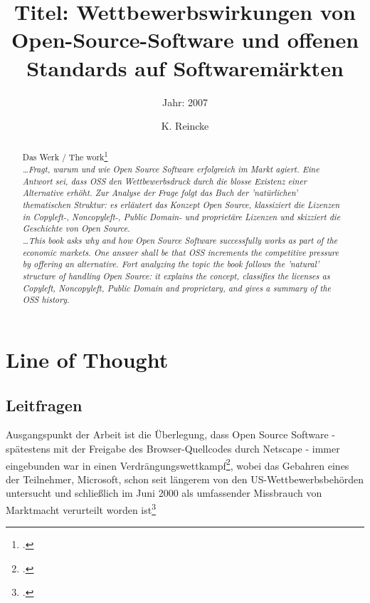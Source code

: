 \documentclass[DIV=calc,BCOR=5mm,11pt,headings=small,oneside,abstract=true, toc=bib]{scrartcl}
\begin{document}

\titlehead{Literaturexzerpt}
\subject{Autor(en): Mundhenke}
\title{Titel: Wettbewerbswirkungen von Open-Source-Software und offenen
Standards auf Softwaremärkten}
\subtitle{Jahr: 2007 }
\author{K. Reincke}

\maketitle

\begin{abstract}
\noindent
Das Werk / The work\footcite[][]{Mundhenke2007a} \\
\noindent \itshape
\ldots Fragt, warum und wie Open Source Software erfolgreich im Markt agiert.
Eine Antwort sei, dass OSS den Wettbewerbsdruck durch die blosse Existenz einer
Alternative erhöht. Zur Analyse der Frage folgt das Buch der 'natürlichen'
thematischen Struktur: es erläutert das Konzept Open Source, klassiziert die
Lizenzen in Copyleft-, Noncopyleft-, Public Domain- und proprietäre Lizenzen und
skizziert die Geschichte von Open Source.\\
\noindent
\ldots This book asks why and how Open Source Software successfully works as
part of the economic markets. One answer shall be that OSS increments the
competitive pressure by offering an alternative. Fort analyzing the topic the
book follows the 'natural' structure of handling Open Source: it explains the
concept, classifies the licenses as Copyleft, Noncopyleft, Public Domain and
proprietary, and gives a summary of the OSS history.
\end{abstract}
\footnotesize
\normalsize

\section{Line of Thought}

\subsection{Leitfragen}

Ausgangspunkt der Arbeit ist die Überlegung, dass Open Source Software -
spätestens mit der Freigabe des Browser-Quellcodes durch Netscape - immer
eingebunden war in einen
Verdrängungswettkampf\footcite[vgl.][1]{Mundhenke2007a}, wobei das Gebahren
eines der Teilnehmer, Microsoft, schon seit längerem von den
\glqq{}US-Wettbewerbsbehörden\grqq{} untersucht und schließlich \glqq{}im Juni
2000\grqq{} als \glqq{}umfassender Missbrauch von Marktmacht\grqq{}
verurteilt worden ist\footcite[vgl.][2]{Mundhenke2007a}
\end{document}
